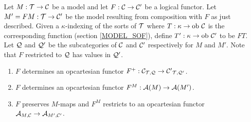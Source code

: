 Let $M: \cal T \to {\bf \cal C}$ be a model and let $F : {\bf \cal C} \to {\bf \cal C}'$ 
be a logical functor. Let $M'=FM : \cal T \to {\bf \cal C}'$ be the model 
resulting from composition with $F$ as just described. Given a 
$\kappa$-indexing of the sorts of $\cal T$ where $T : \kappa \to 
\mbox{ob }{\bf \cal C}$ is the corresponding function (section 
\ref{MODEL_SOF}), define $T' : \kappa \to \mbox{ob }{\bf \cal C}'$ to be 
$FT$. Let ${\bf \cal Q}$ and ${\bf \cal Q}'$ be the subcategories of ${\bf \cal C}$ and 
${\bf \cal C}'$ respectively for $M$ and $M'$. Note that $F$ restricted to 
${\bf \cal Q}$ has values in ${\bf \cal Q}'$.

\begin{thm} \label{FM_THM}
\begin{enumerate}
\item $F$ determines an opcartesian functor $F^+ : {{\bf \cal C}}_{{\cal 
T},{\bf \cal Q}} \to {{\bf \cal C}'}_{{\cal T},{\bf \cal Q}'}$. \item $F$ determines an 
opcartesian functor $F^M : {\bf \cal A} (M) \to {\bf \cal A} (M')$.
\item $F$ preserves $M$-maps and $F^M$ restricts to an opcartesian 
functor ${{\bf \cal A}}_{{M},{{\bf \cal C}}} \to {{\bf \cal A}}_{{M'},{{\bf \cal C}'}}$.
\end{enumerate}
\end{thm}

